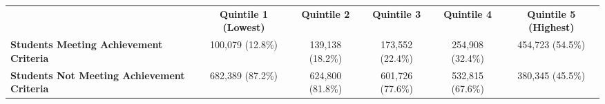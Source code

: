 \begin{tabular*}{\textwidth}{@{\extracolsep{\fill} } lccccc}%
&\multirow{2}{0.5in}{\bfseries\centering Quintile 1 (Lowest)}&\multirow{2}{0.5in}{\bfseries Quintile 2}&\multirow{2}{0.5in}{\bfseries Quintile 3}&\multirow{2}{0.5in}{\bfseries Quintile 4}&\multirow{2}{0.5in}{\bfseries\centering Quintile 5 (Highest)}\\%
&&&&&\\%
\hline%
\textbf{Students Meeting Achievement Criteria}&100,079 (12.8\%)&139,138 (18.2\%)&173,552 (22.4\%)&254,908 (32.4\%)&454,723 (54.5\%)\\%
\textbf{Students Not Meeting Achievement Criteria}&682,389 (87.2\%)&624,800 (81.8\%)&601,726 (77.6\%)&532,815 (67.6\%)&380,345 (45.5\%)\\%
\hline%
\end{tabular*}